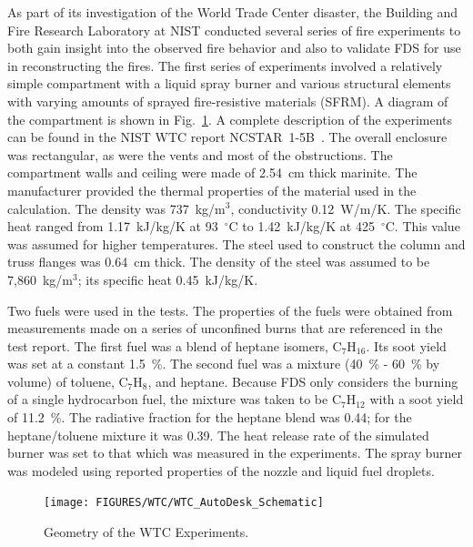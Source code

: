 As part of its investigation of the World Trade Center disaster, the Building and Fire Research Laboratory at NIST conducted several series of fire experiments to both gain insight into the
observed fire behavior and also to validate FDS for use in reconstructing the fires. The first series of experiments involved a relatively simple compartment with a liquid spray burner and
various structural elements with varying amounts of sprayed fire-resistive materials (SFRM). A diagram of the compartment is shown in Fig.~\ref{WTC_Drawing}.
A complete description of the experiments can be found in the NIST WTC report NCSTAR~1-5B~\cite{NIST_NCSTAR_1-5B}.
The overall enclosure was rectangular, as were the vents and most of the obstructions. The compartment walls and ceiling were made of 2.54~cm thick marinite. The manufacturer provided the thermal properties of the material used in the calculation. The density was 737~kg/m$^3$, conductivity 0.12~W/m/K. The specific heat ranged from 1.17~kJ/kg/K at 93~$^\circ$C to
1.42~kJ/kg/K at 425~$^\circ$C. This value was assumed for higher temperatures.
The steel used to construct the column and truss flanges was 0.64~cm thick.  The density of the steel was assumed to be 7,860~kg/m$^3$; its specific heat 0.45~kJ/kg/K.

Two fuels were used in the tests. The properties of the fuels were obtained from measurements made on a series of unconfined burns that are referenced in the test report.
The first fuel was a blend of heptane isomers, C$_7$H$_{16}$. Its soot yield was set at a constant 1.5~\%. The second fuel was a mixture (40~\% - 60~\% by volume) of toluene, C$_7$H$_8$,
and heptane. Because FDS only considers the burning of a single hydrocarbon fuel, the mixture was taken to be C$_7$H$_{12}$ with a soot yield of 11.2~\%.
The radiative fraction for the heptane blend was 0.44; for the heptane/toluene mixture it was 0.39.
The heat release rate of the simulated burner was set to that which was measured in the experiments. The spray burner was modeled using reported properties of the nozzle and
liquid fuel droplets.

\begin{figure}
\begin{center}
\texttt{[image: FIGURES/WTC/WTC\_AutoDesk\_Schematic]}
\end{center}
\caption[Geometry of the WTC Experiments]{Geometry of the WTC Experiments.}
\label{WTC_Drawing}
\end{figure}

\clearpage







